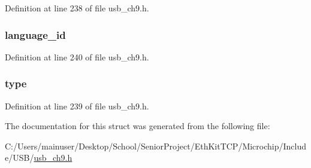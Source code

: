 Definition at line 238 of file usb\+\_\+ch9.\+h.

\hypertarget{struct_d_e_s_c_r_i_p_t_o_r___i_d_a0eb9c920ac13d369be35897e9765dab1}{}
\subsubsection[{language\+\_\+id}]{ language\+\_\+id}\label{struct_d_e_s_c_r_i_p_t_o_r___i_d_a0eb9c920ac13d369be35897e9765dab1}


Definition at line 240 of file usb\+\_\+ch9.\+h.

\hypertarget{struct_d_e_s_c_r_i_p_t_o_r___i_d_aab7cf12125f16245546ef7411994ebb9}{}
\subsubsection[{type}]{ type}\label{struct_d_e_s_c_r_i_p_t_o_r___i_d_aab7cf12125f16245546ef7411994ebb9}


Definition at line 239 of file usb\+\_\+ch9.\+h.



The documentation for this struct was generated from the following file\+:\begin{DoxyCompactItemize}
\item 
C\+:/\+Users/mainuser/\+Desktop/\+School/\+Senior\+Project/\+Eth\+Kit\+T\+C\+P/\+Microchip/\+Include/\+U\+S\+B/\hyperlink{usb__ch9_8h}{usb\+\_\+ch9.\+h}\end{DoxyCompactItemize}
